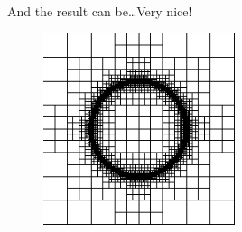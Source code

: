 \documentclass[8pt]{beamer}
\begin{document}
\begin{frame}
 And the result can be\dots Very nice!
  \begin{figure}[!h]
\begin{center}
\includegraphics[width=0.5\textwidth]{./figures/integrator/pi_1.pdf}
\end{center}
\end{figure}
 
\end{frame}
\end{document}
